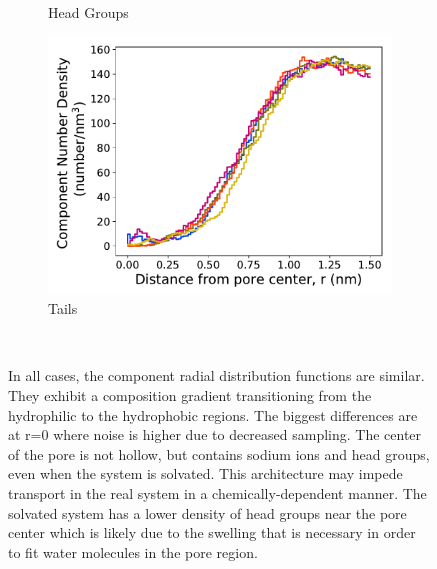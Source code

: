 \documentclass[journal=jpcbfk,manuscript=article]{achemso}
\begin{document}
\begin{figure}[!htb]
\begin{subfigure}{0.32\textwidth}
        \caption{Head Groups}
        \label{fig:head_groups_regional_density}
  \end{subfigure}
  \begin{subfigure}{0.32\textwidth}
        \includegraphics[width=1\linewidth]{tails_density.pdf}
        \caption{Tails}
        \label{fig:tails_regional_density}
  \end{subfigure}
  \caption{In all cases, the component radial distribution functions are similar. 
      They exhibit a composition gradient transitioning from the hydrophilic to the hydrophobic
	  regions. The biggest differences are at r=0 where noise is higher due to 
	  decreased sampling. The center of the pore is not hollow, but contains sodium ions and 
	  head groups, even when the system is solvated. This architecture may impede transport in 
	  the real system in a chemically-dependent manner. 
          The solvated system has a lower density of head groups near the 
	  pore center which is likely due to the swelling that is necessary in order to fit water
	  molecules in the pore region.}~\label{fig:overlaid_densities}
  \end{figure}
\end{document}
